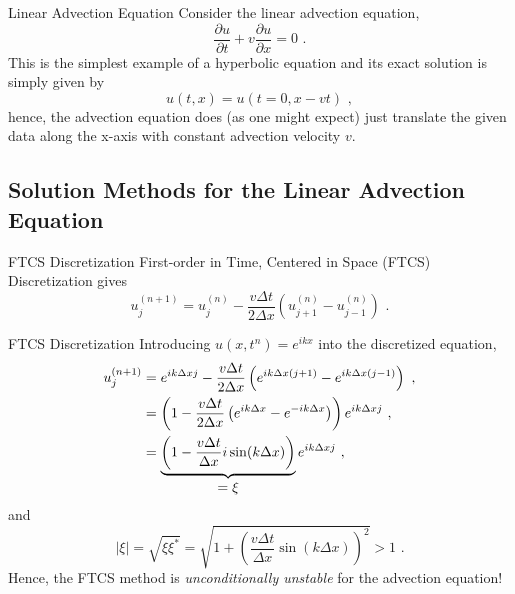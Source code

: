 \documentclass[11pt]{beamer}
\begin{document}
\begin{frame}[fragile]{Linear Advection Equation}
Consider the linear advection equation,
\begin{equation}
\frac{\partial u}{\partial t}  + v \frac{\partial u}{\partial x} = 0\,\,.
\end{equation}
This is the simplest example of a hyperbolic equation and its exact
solution is simply given by
\begin{equation}
u(t,x) = u(t=0,x-vt)\,\,,
\label{eq:pde_advect1}
\end{equation}
hence, the advection equation does (as one might expect) just translate
the given data along the x-axis with constant advection velocity $v$.
\end{frame}

\subsection{Solution Methods for the Linear Advection Equation}
\begin{frame}[fragile]{FTCS Discretization}
First-order in Time, Centered in Space (FTCS) Discretization gives
\begin{equation}
  u^{(n+1)}_j = u^{(n)}_j - \frac{v \Delta t}{2\Delta x} \left(u^{(n)}_{j+1} - u^{(n)}_{j-1}\right)\,\,.
\end{equation}
\end{frame}

\begin{frame}[fragile]{FTCS Discretization}
Introducing $u(x,t^{n}) = e^{ikx}$ into the discretized  equation,
\begin{equation}
\begin{aligned}
u^{(n+1)}_j &= e^{ik\Delta x j} - \frac{v \Delta t}{2\Delta x} \left(e^{ik\Delta x (j+1)} - e^{ik\Delta x (j-1)}\right)\,\,,\\
&= \left(1 - \frac{v\Delta t}{2 \Delta x} \left( e^{ik\Delta x} - e^{-ik\Delta x} \right) \right) e^{ik\Delta x j}\,\,,\\
&= \underbrace{\left( 1- \frac{v\Delta t}{\Delta x} i \sin(k\Delta x) \right)}_{\parbox{3cm}{\centering $=\xi$}} e^{ik\Delta x j}\,\,,
\end{aligned}
\end{equation}
and 
\begin{equation}
|\xi| = \sqrt{\xi \xi^*} = \sqrt{1 + \left(\frac{v\Delta t}{\Delta x} \sin(k\Delta x)\right)^2} > 1\,\,.
\end{equation}
Hence, the FTCS method is \emph{unconditionally unstable} for the
advection equation!
\end{frame}
\end{document}
